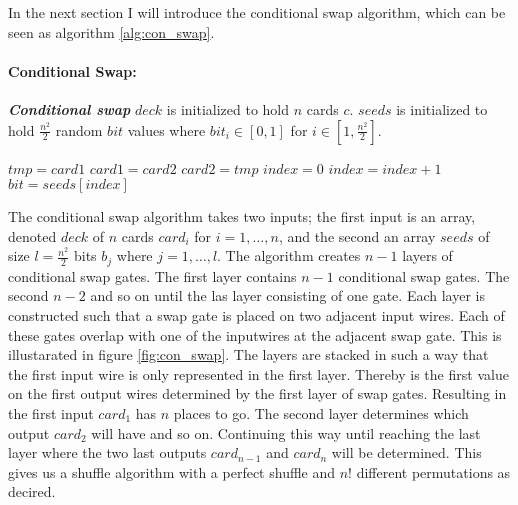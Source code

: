 \documentclass[twoside,11pt,openright]{report}
\begin{document}
\bigskip

In the next section I will introduce the conditional swap algorithm, which can be seen as algorithm \ref{alg:con_swap}.

\bigskip

\paragraph{Conditional Swap:}
\label{sec:con_swap}

\begin{algorithm}
\caption{\textbf{\textit{Conditional swap}} \newline
    $deck$ is initialized to hold $n$ cards $c$. \newline
    $seeds$ is initialized to hold $\frac{n^2}{2}$ random $bit$ values where $bit_i\in[0,1]$ for $i\in [1,\frac{n^2}{2}]$.
}
\label{alg:con_swap}

\begin{algorithmic}[1]
\State $tmp = card1$
\State $card1 = card2$
\State $card2 = tmp$
\EndIf
\EndFunction
\State
{}
\State $index = 0$
\State $index = index + 1$
\State $bit = seeds[index]$
\State {}
\EndFor
\EndFor
\EndFunction
\end{algorithmic}
\end{algorithm}


The conditional swap algorithm takes two inputs; the first input is an array, denoted $deck$ of $n$ cards $card_i$ for $i=1,\dots,n$, and the second an array $seeds$ of size $l=\frac{n^2}{2}$ bits $b_j$ where $j=1,\dots, l$. The algorithm creates $n-1$ layers of conditional swap gates. The first layer contains $n-1$ conditional swap gates. The second $n-2$ and so on until the las layer consisting of one gate. Each layer is constructed such that a swap gate is placed on two adjacent input wires. Each of these gates overlap with one of the inputwires at the adjacent swap gate. This is illustarated in figure \ref{fig:con_swap}. The layers are stacked in such a way that the first input wire is only represented in the first layer. Thereby is the first value on the first output wires determined by the first layer of swap gates. Resulting in the first input $card_1$ has $n$ places to go. The second layer determines which output $card_2$ will have and so on. Continuing this way until reaching the last layer where the two last outputs $card_{n-1}$ and $card_n$ will be determined. This gives us a shuffle algorithm with a perfect shuffle and $n!$ different permutations as decired.
\end{document}
